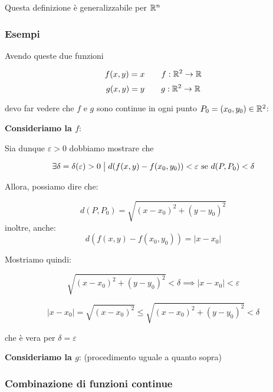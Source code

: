 Questa definizione è generalizzabile per \(\mathbb{R}^{n} \)

\subsubsection*{Esempi}

Avendo queste due funzioni

\[
    f(x,y) = x \qquad f: \mathbb{R}^2 \to \mathbb{R}
\]
\[
    g(x,y) = y \qquad g: \mathbb{R}^2 \to \mathbb{R}
\]

devo far vedere che \(f\) e \(g\) sono continue in ogni punto \(P_0 = (x_0,y_0) \in \mathbb{R}^2 \):

\textbf{Consideriamo la \(f\)}:

Sia dunque \(\varepsilon >0\) dobbiamo mostrare che

\[
    \exists \delta= \delta(\varepsilon) >0 \;\big|\; d(f(x,y)- f(x_0,y_0)) < \varepsilon \text{ se } d(P,P_0) < \delta
\]

Allora, possiamo dire che:

\[
    d(P,P_0) = \sqrt{{(x-x_0)}^{2}+{(y-y_0)}^{2}}
\]
inoltre, anche:
\[
    d(f(x,y)- f(x_0,y_0)) = |x-x_0|
\]

Mostriamo quindi:

\[
    \sqrt{{(x-x_0)}^{2}+{(y-y_0)}^{2}} < \delta \implies |x-x_0| < \varepsilon
\]

\[
    |x-x_0| = \sqrt{{(x-x_0)}^{2}}\le \sqrt{{(x - x_0)}^{2} + {(y-y_0)}^{2}} < \delta
\]

che è vera per \( \delta = \varepsilon \)

\textbf{Consideriamo la \(g\)}: (procedimento uguale a quanto sopra)

\subsubsection{Combinazione di funzioni continue}


